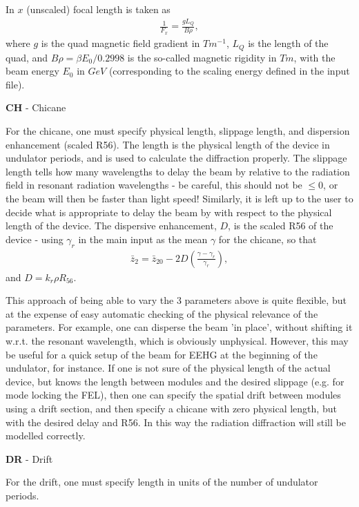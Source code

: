 \documentclass[12pt]{article}%
\begin{document}
In $x$ (unscaled) focal length is taken as
\begin{align}
\frac{1}{F_x} = \frac{g L_Q}{B\rho},
\end{align}
where $g$ is the quad magnetic field gradient in $Tm^{-1}$, $L_Q$ is the length of the quad, and $B\rho = \beta E_0 / 0.2998$ is the so-called magnetic rigidity in $Tm$, with the beam energy $E_0$ in $GeV$ (corresponding to the scaling energy defined in the input file).

{\bf CH} - Chicane

For the chicane, one must specify physical length, slippage length, and dispersion enhancement (scaled R56). The length is the physical length of the device in undulator periods, and is used to calculate the diffraction properly. The slippage length tells how many wavelengths to delay the beam by relative to the radiation field in resonant radiation wavelengths - be careful, this should not be $\leq 0$, or the beam will then be faster than light speed! Similarly, it is left up to the user to decide what is appropriate to delay the beam by with respect to the physical length of the device. The dispersive enhancement, $D$, is the scaled R56 of the device - using $\gamma_r$ in the main input as the mean $\gamma$ for the chicane, so that
\begin{align}
\bar{z}_{2} = \bar{z}_{20} - 2D \left( \frac{\gamma - \gamma_r}{\gamma_r}  \right),
\end{align}
and $D = k_r \rho  R_{56}$.

This approach of being able to vary the 3 parameters above is quite flexible, but at the expense of easy automatic checking of the physical relevance of the parameters. For example, one can disperse the beam 'in place', without shifting it w.r.t. the resonant wavelength, which is obviously unphysical. However, this may be useful for a quick setup of the beam for EEHG at the beginning of the undulator, for instance. If one is not sure of the physical length of the actual device, but knows the length between modules and the desired slippage (e.g. for mode locking the FEL), then one can specify the spatial drift between modules using a drift section, and then specify a chicane with zero physical length, but with the desired delay and R56. In this way the radiation diffraction will still be modelled correctly.

{\bf DR} - Drift

For the drift, one must specify length in units of the number of undulator periods.
\end{document}
